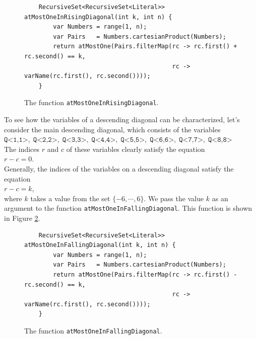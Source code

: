 \begin{figure}[!ht]
  \centering
\begin{verbatim}
    RecursiveSet<RecursiveSet<Literal>> atMostOneInRisingDiagonal(int k, int n) {
        var Numbers = range(1, n);
        var Pairs   = Numbers.cartesianProduct(Numbers);
        return atMostOne(Pairs.filterMap(rc -> rc.first() + rc.second() == k,
                                         rc -> varName(rc.first(), rc.second())));
    }
\end{verbatim}
\vspace*{-0.3cm}
  \caption{The function \texttt{atMostOneInRisingDiagonal}.}
  \label{fig:atMostOneInUpperDiagonal}
\end{figure}

To see how the variables of a descending diagonal can be characterized, let's consider the main descending diagonal, which consists of the
variables \\[0.2cm]
\hspace*{1.3cm} 
$\texttt{Q<1,1>},\; \texttt{Q<2,2>},\; \texttt{Q<3,3>},\; \texttt{Q<4,4>},\; \texttt{Q<5,5>},\; 
 \texttt{Q<6,6>},\; \texttt{Q<7,7>},\; \texttt{Q<8,8>}$ 
\\[0.2cm]
The indices $r$ and $c$ of these variables clearly satisfy
the equation \\[0.2cm]
\hspace*{1.3cm} $r - c = 0$. \\[0.2cm]
Generally, the indices of the variables on a descending diagonal satisfy the equation \\[0.2cm]
\hspace*{1.3cm} $r - c = k$, \\[0.2cm]
where $k$ takes a value from the set $\{-6, \cdots, 6 \}$. We pass the value $k$ as an argument to the
function \texttt{atMostOneInFallingDiagonal}. This function is shown in Figure
\ref{fig:atMostOneInLowerDiagonal}.

\begin{figure}[!ht]
  \centering
\begin{verbatim}
    RecursiveSet<RecursiveSet<Literal>> atMostOneInFallingDiagonal(int k, int n) {
        var Numbers = range(1, n);
        var Pairs   = Numbers.cartesianProduct(Numbers);
        return atMostOne(Pairs.filterMap(rc -> rc.first() - rc.second() == k,
                                         rc -> varName(rc.first(), rc.second())));
    }
\end{verbatim}
\vspace*{-0.3cm}
  \caption{The function \texttt{atMostOneInFallingDiagonal}.}
  \label{fig:atMostOneInLowerDiagonal}
\end{figure}


